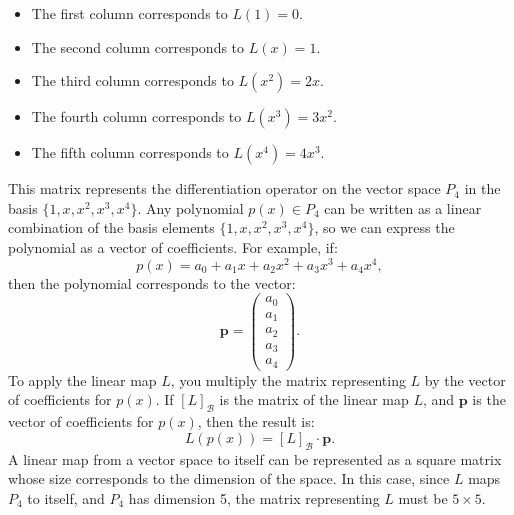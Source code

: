 \documentclass{report}
\begin{document}
\begin{itemize}
\begin{itemize}
                \item The first column corresponds to \( L(1) = 0 \).\\
                \item The second column corresponds to \( L(x) = 1 \).\\
                \item The third column corresponds to \( L(x^2) = 2x \).\\
                \item The fourth column corresponds to \( L(x^3) = 3x^2 \).\\
                \item The fifth column corresponds to \( L(x^4) = 4x^3 \).\\
            \end{itemize}
            This matrix represents the differentiation operator on the vector space \( P_4 \) in the basis \( \{1, x, x^2, x^3, x^4\} \).
            \bigbreak \noindent 
            Any polynomial \( p(x) \in P_4 \) can be written as a linear combination of the basis elements \( \{1, x, x^2, x^3, x^4\} \), so we can express the polynomial as a vector of coefficients. For example, if:
            \[
                p(x) = a_0 + a_1x + a_2x^2 + a_3x^3 + a_4x^4,
            \]
            then the polynomial corresponds to the vector:
            \[
                \mathbf{p} = \begin{pmatrix}
                    a_0 \\
                    a_1 \\
                    a_2 \\
                    a_3 \\
                    a_4
                \end{pmatrix}.
            \]
            To apply the linear map \( L \), you multiply the matrix representing \( L \) by the vector of coefficients for \( p(x) \).
            \bigbreak \noindent 
            If \( [L]_{\mathcal{B}} \) is the matrix of the linear map \( L \), and \( \mathbf{p} \) is the vector of coefficients for \( p(x) \), then the result is:
            \[
                L(p(x)) = [L]_{\mathcal{B}} \cdot \mathbf{p}.
            \]
            \bigbreak \noindent 
            A linear map from a vector space to itself can be represented as a square matrix whose size corresponds to the dimension of the space. In this case, since \( L \) maps \( P_4 \) to itself, and \( P_4 \) has dimension 5, the matrix representing \( L \) must be \( 5 \times 5 \).

\end{itemize}
\end{document}
